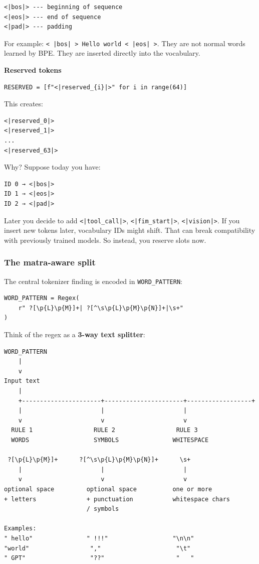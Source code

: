 \begin{lstlisting}[style=shadedpython,language={},basicstyle=\footnotesize\ttfamily]
<|bos|> --- beginning of sequence
<|eos|> --- end of sequence
<|pad|> --- padding
\end{lstlisting}

For example: \texttt{< |bos| > Hello world < |eos| >}. They are not normal
words learned by BPE. They are inserted directly into the vocabulary.

\noindent\textbf{Reserved tokens}
\begin{lstlisting}[style=shadedpython,breaklines=true]
RESERVED = [f"<|reserved_{i}|>" for i in range(64)]
\end{lstlisting}
This creates:
\begin{lstlisting}[style=shadedpython,language={},basicstyle=\footnotesize\ttfamily]
<|reserved_0|>
<|reserved_1|>
...
<|reserved_63|>
\end{lstlisting}

Why? Suppose today you have:
\begin{lstlisting}[style=shadedpython,language={},basicstyle=\footnotesize\ttfamily]
ID 0 → <|bos|>
ID 1 → <|eos|>
ID 2 → <|pad|>
\end{lstlisting}
Later you decide to add \texttt{<|tool\_call|>}, \texttt{<|fim\_start|>},
\texttt{<|vision|>}. If you insert new tokens later, vocabulary IDs might
shift. That can break compatibility with previously trained models. So
instead, you reserve slots now.

\subsubsection*{The matra-aware split}

The central tokenizer finding is encoded in \texttt{WORD\_PATTERN}:

\begin{lstlisting}[style=shadedpython,breaklines=true]
WORD_PATTERN = Regex(
    r" ?[\p{L}\p{M}]+| ?[^\s\p{L}\p{M}\p{N}]+|\s+"
)
\end{lstlisting}

Think of the regex as a \textbf{3-way text splitter}:

\begin{lstlisting}[style=shadedpython,language={},basicstyle=\footnotesize\ttfamily]
WORD_PATTERN
    |
    v
Input text
    |
    +----------------------+----------------------+------------------+
    |                      |                      |
    v                      v                      v
  RULE 1                 RULE 2                 RULE 3
  WORDS                  SYMBOLS               WHITESPACE

 ?[\p{L}\p{M}]+      ?[^\s\p{L}\p{M}\p{N}]+      \s+
    |                      |                      |
    v                      v                      v
optional space         optional space          one or more
+ letters              + punctuation           whitespace chars
                       / symbols

Examples:
" hello"               " !!!"                  "\n\n"
"world"                 ","                     "\t"
" GPT"                  "??"                    "   "
\end{lstlisting}


